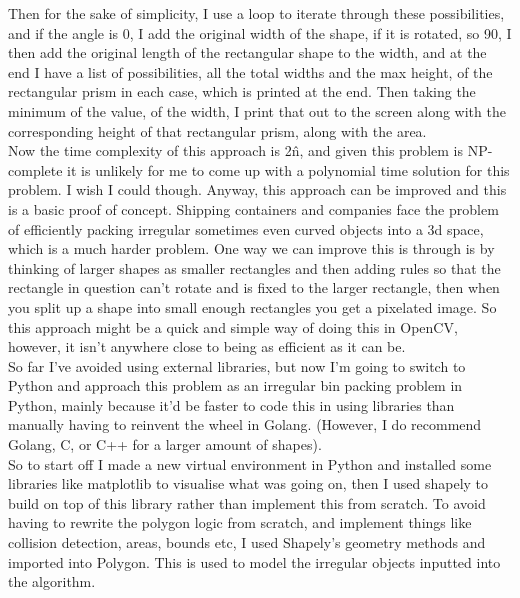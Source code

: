 \documentclass[a4paper]{article}
\begin{document}
Then for the sake of simplicity, I use a loop to iterate through these possibilities, and if the angle is 0, I add the original width of the shape, if it is rotated, so 90, I then add the original length of the rectangular shape to the width, and at the end I have a list of possibilities, all the total widths and the max height, of the rectangular prism in each case, which is printed at the end. Then taking the minimum of the value, of the width, I print that out to the screen along with the corresponding height of that rectangular prism, along with the area.\\

   Now the time complexity of this approach is 2\^n, and given this problem is NP-complete it is unlikely for me to come up with a polynomial time solution for this problem. I wish I could though. Anyway, this approach can be improved and this is a basic proof of concept. Shipping containers and companies face the problem of efficiently packing irregular sometimes even curved objects into a 3d space, which is a much harder problem. One way we can improve this is through is by thinking of larger shapes as smaller rectangles and then adding rules so that the rectangle in question can't rotate and is fixed to the larger rectangle, then when you split up a shape into small enough rectangles you get a pixelated image. So this approach might be a quick and simple way of doing this in OpenCV, however, it isn't anywhere close to being as efficient as it can be.\\


    So far I've avoided using external libraries, but now I'm going to switch to Python and approach this problem as an irregular bin packing problem in Python, mainly because it'd be faster to code this in using libraries than manually having to reinvent the wheel in Golang. (However, I do recommend Golang, C, or C++ for a larger amount of shapes). \\

    So to start off I made a new virtual environment in Python and installed some libraries like matplotlib to visualise what was going on, then I used shapely to build on top of this library rather than implement this from scratch. To avoid having to rewrite the polygon logic from scratch, and implement things like collision detection, areas, bounds etc, I used Shapely's geometry methods and imported into Polygon. This is used to model the irregular objects inputted into the algorithm.\\
\end{document}
